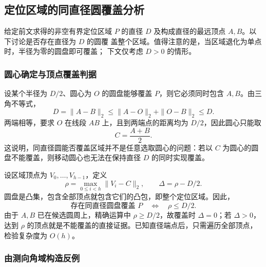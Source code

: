 \providecommand{\coveragepagebreak}{}
\subsection*{定位区域的同直径圆覆盖分析}

给定前文求得的非空有界定位区域 $P$ 的直径 $D$ 及构成直径的最远顶点 $A,B$。以下讨论是否存在直径为 $D$ 的圆覆
盖整个区域。值得注意的是，当区域退化为单点时，半径为零的圆盘即可覆盖；
下文仅考虑 $D>0$ 的情形。

\subsubsection*{圆心确定与顶点覆盖判据}

设某个半径为 $D/2$、圆心为 $O$ 的圆盘能够覆盖 $P$，则它必须同时包含 $A,B$。由三角不等式，
\begin{equation}\label{eq:cov-center}
D=\|A-B\|_2\le\|A-O\|_2+\|O-B\|_2\le D.
\end{equation}
两端相等，要求 $O$ 在线段 $AB$ 上，且到两端点的距离均为 $D/2$，因此圆心只能取
\begin{equation}
C=\frac{A+B}{2}.
\end{equation}
这说明，同直径圆能否覆盖区域并不是任意选取圆心的问题：若以 $C$ 为圆心的圆盘不能覆盖，则移动圆心也无法在保持直径 $D$ 的同时实现覆盖。

设区域顶点为 $V_0,\ldots,V_{h-1}$，定义
\begin{equation}
\rho=\max_{0\le i<h}\|V_i-C\|_2,\qquad \Delta=\rho-D/2.
\end{equation}
圆盘是凸集，包含全部顶点就包含它们的凸包，即整个定位区域。因此，
\begin{equation}\label{eq:cov-check}
\boxed{\text{存在同直径圆盘覆盖 }P\quad\Longleftrightarrow\quad\rho\le D/2.}
\end{equation}
由于 $A,B$ 已在候选圆周上，精确运算中 $\rho\ge D/2$，故覆盖时 $\Delta=0$；若 $\Delta>0$，达到 $\rho$ 的顶点就是不能覆盖的直接证据。已知直径端点后，只需遍历全部顶点，检验复杂度为 $O(h)$。

\subsubsection*{由测向角域构造反例}

